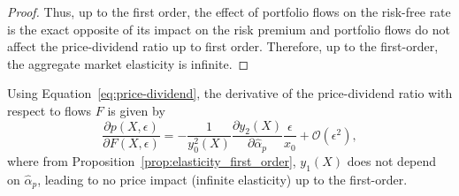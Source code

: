 \begin{proof}
%	
%	
	Thus, up to the first order, the effect of portfolio flows on the risk-free rate is the exact opposite of its impact on the risk premium and portfolio flows do not affect the price-dividend ratio up to first order. Therefore, up to the first-order, the aggregate market elasticity is infinite. 
\end{proof}

Using Equation~\eqref{eq:price-dividend}, the derivative of the price-dividend ratio with respect to flows $F$ is given by
\begin{equation}
\frac{\partial p(X,\epsilon)}{\partial F(X,\epsilon)} =%
-\frac{1}{y_0^2(X)} \frac{\partial y_2(X)}{\partial \hat{\alpha}_p}\frac{\epsilon}{x_0} + \mathcal{O}(\epsilon^2),
\end{equation}
where from Proposition~\ref{prop:elasticity_first_order}, $ y_1(X) $ does not depend on $ \hat{\alpha}_p $, leading to no price impact (infinite elasticity) up to the first-order.

